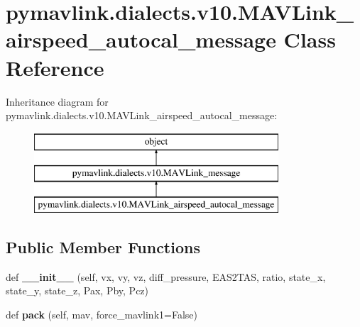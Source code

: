 \hypertarget{classpymavlink_1_1dialects_1_1v10_1_1MAVLink__airspeed__autocal__message}{}\section{pymavlink.\+dialects.\+v10.\+M\+A\+V\+Link\+\_\+airspeed\+\_\+autocal\+\_\+message Class Reference}
\label{classpymavlink_1_1dialects_1_1v10_1_1MAVLink__airspeed__autocal__message}
Inheritance diagram for pymavlink.\+dialects.\+v10.\+M\+A\+V\+Link\+\_\+airspeed\+\_\+autocal\+\_\+message\+:\begin{figure}[H]
\begin{center}
\leavevmode
\includegraphics[height=3.000000cm]{classpymavlink_1_1dialects_1_1v10_1_1MAVLink__airspeed__autocal__message}
\end{center}
\end{figure}
\subsection*{Public Member Functions}
\begin{DoxyCompactItemize}
\item 
\mbox{\label{classpymavlink_1_1dialects_1_1v10_1_1MAVLink__airspeed__autocal__message_a53a1926d0a20ef2f70d90334b74dae07}} 
def {\bfseries \+\_\+\+\_\+init\+\_\+\+\_\+} (self, vx, vy, vz, diff\+\_\+pressure, E\+A\+S2\+T\+AS, ratio, state\+\_\+x, state\+\_\+y, state\+\_\+z, Pax, Pby, Pcz)
\item 
\mbox{\label{classpymavlink_1_1dialects_1_1v10_1_1MAVLink__airspeed__autocal__message_a8e6b6663efc74ad18aba9834f15317ce}} 
def {\bfseries pack} (self, mav, force\+\_\+mavlink1=False)
\end{DoxyCompactItemize}
